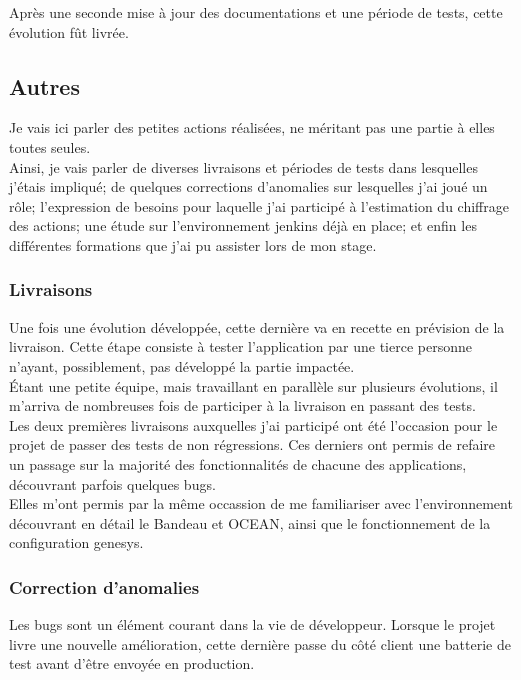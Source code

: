 \documentclass{rapport}
\begin{document}
Après une seconde mise à jour des documentations et une période de tests, cette évolution fût livrée.\\

\newpage
\subsection{Autres}
Je vais ici parler des petites actions réalisées, ne méritant pas une partie à elles toutes seules.\\
Ainsi, je vais parler de diverses livraisons et périodes de tests dans lesquelles j'étais impliqué; de quelques corrections d'anomalies sur lesquelles j'ai joué un rôle; l'expression de besoins pour laquelle j'ai participé à l'estimation du chiffrage des actions; une étude sur l'environnement jenkins déjà en place; et enfin les différentes formations que j'ai pu assister lors de mon stage.

\subsubsection{Livraisons}

Une fois une évolution développée, cette dernière va en recette en prévision de la livraison. Cette étape consiste à tester l'application par une tierce personne n'ayant, possiblement, pas développé la partie impactée.\\
Étant une petite équipe, mais travaillant en parallèle sur plusieurs évolutions, il m'arriva de nombreuses fois de participer à la livraison en passant des tests.\\

Les deux premières livraisons auxquelles j'ai participé ont été l'occasion pour le projet de passer des tests de non régressions. Ces derniers ont permis de refaire un passage sur la majorité des fonctionnalités de chacune des applications, découvrant parfois quelques bugs. \\
Elles m'ont permis par la même occassion de me familiariser avec l'environnement découvrant en détail le Bandeau et OCEAN, ainsi que le fonctionnement de la configuration genesys.

\subsubsection{Correction d'anomalies}

Les bugs sont un élément courant dans la vie de développeur. Lorsque le projet livre une nouvelle amélioration, cette dernière passe du côté client une batterie de test avant d'être envoyée en production.\\
\end{document}
